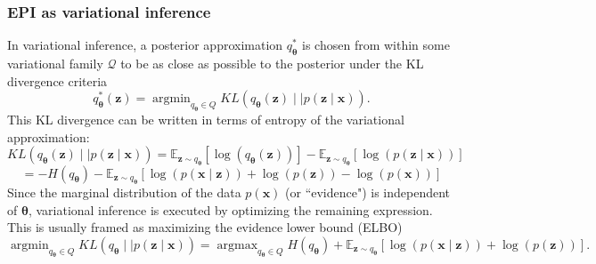 \documentclass[11pt]{article}
\DeclareMathOperator*{\argmin}{argmin}
\DeclareMathOperator*{\argmax}{argmax}
\begin{document}
\subsubsection{EPI as variational inference}\label{methods_VI}

In variational inference, a posterior approximation $q_{\bm{\theta}}^*$ is chosen from within some variational family $\mathcal{Q}$ to be as close as possible to the posterior under the KL divergence criteria
\begin{equation}
q_{\bm{\theta}}^*(\mathbf{z}) = \argmin_{q_{\bm{\theta}} \in Q} KL(q_{\bm{\theta}}(\mathbf{z}) \mid \mid p(\mathbf{z} \mid \mathbf{x})).
\end{equation}
This KL divergence can be written in terms of entropy of the variational approximation:
\begin{equation}
KL(q_{\bm{\theta}}(\mathbf{z})  \mid \mid p(\mathbf{z} \mid \mathbf{x})) = \mathbb{E}_{\mathbf{z} \sim q_{\bm{\theta}}} \left[ \log (q_{\bm{\theta}}(\mathbf{z})) \right] - \mathbb{E}_{\mathbf{z} \sim q_{\bm{\theta}}} \left[ \log (p(\mathbf{z} \mid \mathbf{x})) \right]
\end{equation}
\begin{equation}
= -H(q_{\bm{\theta}}) - \mathbb{E}_{\mathbf{z} \sim q_{\bm{\theta}}} \left[ \log (p(\mathbf{x} \mid \mathbf{z}))  + \log(p(\mathbf{z})) - \log(p(\mathbf{x}))\right]
\end{equation}
Since the marginal distribution of the data $p(\mathbf{x})$ (or ``evidence") is independent of $\bm{\theta}$, variational inference is executed by optimizing the remaining expression.
This is usually framed as maximizing the evidence lower bound (ELBO)
\begin{equation} \label{eq:VI_opt}
\argmin_{q_{\bm{\theta}} \in Q} KL(q_{\bm{\theta}} \mid \mid p(\mathbf{z} \mid \mathbf{x})) = \argmax_{q_{\bm{\theta}} \in Q} H(q_{\bm{\theta}}) + \mathbb{E}_{\mathbf{z} \sim q_{\bm{\theta}}} \left[ \log (p(\mathbf{x} \mid \mathbf{z}))  + \log(p(\mathbf{z}))\right].
\end{equation}
\end{document}
